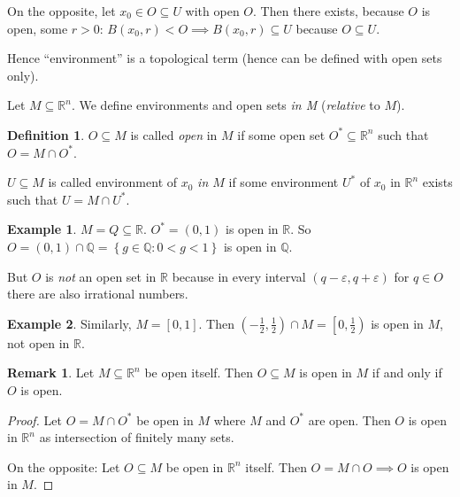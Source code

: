 \documentclass[a4paper,landscape,twocolumn]{article}
\theoremstyle{definition}
\newtheorem{defi}{Definition}
\newtheorem{rem}{Remark}
\newtheorem{ex}{Example}
\newcommand\set[1]{\left\{#1\right\}}
\begin{document}
On the opposite, let $x_0 \in O \subseteq U$ with open $O$.
Then there exists, because $O$ is open, some $r > 0$:
$B(x_0,r) < O \implies B(x_0,r) \subseteq U$ because $O \subseteq U$.

Hence \enquote{environment} is a topological term
(hence can be defined with open sets only).

Let $M \subseteq \mathbb R^n$. We define environments and
open sets \emph{in M} (\emph{relative} to $M$).

\begin{defi}
  $O \subseteq M$ is called \emph{open} in $M$ if some open set
  $O^* \subseteq \mathbb R^n$ such that $O = M \cap O^*$.

  $U \subseteq M$ is called environment of $x_0$ \emph{in $M$} if
  some environment $U^*$ of $x_0$ in $\mathbb R^n$ exists such that
  $U = M \cap U^*$.
\end{defi}

\begin{ex}
  $M = Q \subseteq \mathbb R$.
  $O^* = (0,1)$ is open in $\mathbb R$.
  So $O = (0,1) \cap \mathbb Q = \set{g \in \mathbb Q: 0 < g < 1}$
  is open in $\mathbb Q$.

  But $O$ is \emph{not} an open set in $\mathbb R$ because in every
  interval $(q - \varepsilon, q + \varepsilon)$ for $q \in O$
  there are also irrational numbers.
\end{ex}

\begin{ex}
  Similarly, $M = [0,1]$. Then $\left(-\frac12, \frac12\right) \cap M = \left[0,\frac12\right)$
  is open in $M$, not open in $\mathbb R$.
\end{ex}

\begin{rem}
  Let $M \subseteq \mathbb R^n$ be open itself. Then $O \subseteq M$ is open in $M$
  if and only if $O$ is open.
\end{rem}
\begin{proof}
  Let $O = M \cap O^*$ be open in $M$ where $M$ and $O^*$ are open.
  Then $O$ is open in $\mathbb R^n$ as intersection of finitely many sets.

  On the opposite: Let $O \subseteq M$ be open in $\mathbb R^n$ itself.
  Then $O = M \cap O \implies O$ is open in $M$.
\end{proof}
\end{document}
